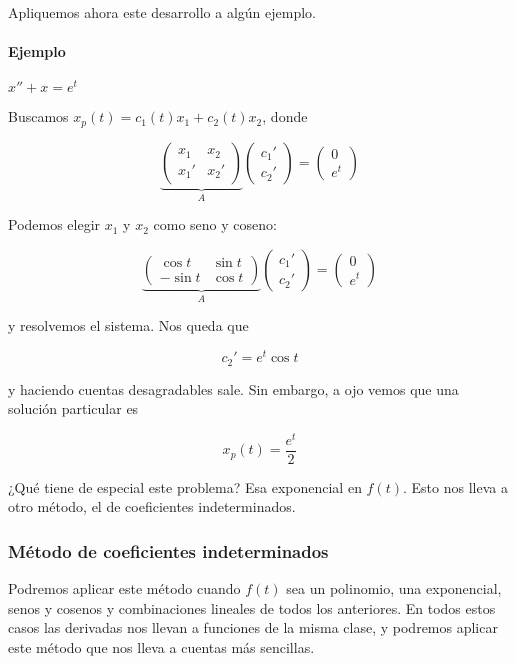 \documentclass[nochap]{apuntes}
\begin{document}
Apliquemos ahora este desarrollo a algún ejemplo.

\paragraph{Ejemplo} $x'' + x = e^t$

Buscamos $x_p(t) = c_1(t) x_1 + c_2(t) x_2$, donde

\[ \underbrace{\begin{pmatrix}
x_1 & x_2 \\
x_1' & x_2' 
\end{pmatrix}}_A\begin{pmatrix}
c_1' \\ c_2'
\end{pmatrix} = \begin{pmatrix}
0 \\ e^t
\end{pmatrix} \] 

Podemos elegir $x_1$ y $x_2$ como seno y coseno:

\[ \underbrace{\begin{pmatrix}
\cos t & \sin t \\
- \sin t & \cos t 
\end{pmatrix}}_A\begin{pmatrix}
c_1' \\ c_2'
\end{pmatrix} = \begin{pmatrix}
0 \\ e^t
\end{pmatrix} \] 

y resolvemos el sistema. Nos queda que 

\[ c_2' = e^t \cos t \]

y haciendo cuentas desagradables sale. Sin embargo, a ojo vemos que una solución particular es

\[ x_p(t) = \frac{e^t}{2} \]

¿Qué tiene de especial este problema? Esa exponencial en $f(t)$. Esto nos lleva a otro método, el de coeficientes indeterminados.

\subsubsection{Método de coeficientes indeterminados}

Podremos aplicar este método cuando $f(t)$ sea un polinomio, una exponencial, senos y cosenos y combinaciones lineales de todos los anteriores. En todos estos casos las derivadas nos llevan a funciones de la misma clase, y podremos aplicar este método que nos lleva a cuentas más sencillas.
\end{document}
